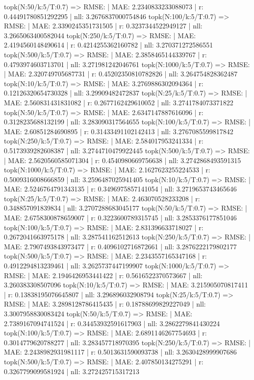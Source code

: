 topk(N:50/k:5/T:0.7) => RMSE: | MAE: 2.2340833233088073 | r: 0.44491780851292295 | nll: 3.2676837000754846
topk(N:100/k:5/T:0.7) => RMSE: | MAE: 2.3390245351731505 | r: 0.3237344522949127 | nll: 3.2665063400582044
topk(N:250/k:5/T:0.7) => RMSE: | MAE: 2.4194560148490614 | r: 0.4214255362160782 | nll: 3.270371272586551
topk(N:500/k:5/T:0.7) => RMSE: | MAE: 2.3858465144339767 | r: 0.4793974603713701 | nll: 3.271981242046761
topk(N:1000/k:5/T:0.7) => RMSE: | MAE: 2.320749705687731 | r: 0.45202350810782826 | nll: 3.264754828362487
topk(N:10/k:5/T:0.7) => RMSE: | MAE: 3.2769886302094364 | r: 0.12126320654730328 | nll: 3.29909482472837
topk(N:25/k:5/T:0.7) => RMSE: | MAE: 2.560831431831082 | r: 0.2677162429610052 | nll: 3.2741784073371822
topk(N:50/k:5/T:0.7) => RMSE: | MAE: 2.6347147887616096 | r: 0.3128235688132199 | nll: 3.283090317564655
topk(N:100/k:5/T:0.7) => RMSE: | MAE: 2.60851284690895 | r: 0.31433491102142413 | nll: 3.2767085599817842
topk(N:250/k:5/T:0.7) => RMSE: | MAE: 2.584017953241334 | r: 0.5173939282608387 | nll: 3.2744710479922445
topk(N:500/k:5/T:0.7) => RMSE: | MAE: 2.5620560585071304 | r: 0.4540980669756638 | nll: 3.2742868493591315
topk(N:1000/k:5/T:0.7) => RMSE: | MAE: 2.1627623255224533 | r: 0.5009316008666859 | nll: 3.2596487025941405
topk(N:10/k:5/T:0.7) => RMSE: | MAE: 2.5246764791343135 | r: 0.3496975857141054 | nll: 3.2719653743465646
topk(N:25/k:5/T:0.7) => RMSE: | MAE: 2.463070528233208 | r: 0.348857091839834 | nll: 3.2707288683045177
topk(N:50/k:5/T:0.7) => RMSE: | MAE: 2.6758300878659007 | r: 0.3223600789315745 | nll: 3.2853376177851046
topk(N:100/k:5/T:0.7) => RMSE: | MAE: 2.831396633718027 | r: 0.2672041663975178 | nll: 3.287541162512613
topk(N:250/k:5/T:0.7) => RMSE: | MAE: 2.7907493843973477 | r: 0.4096102716872661 | nll: 3.2876222179802177
topk(N:500/k:5/T:0.7) => RMSE: | MAE: 2.2343557165347168 | r: 0.4912294813239461 | nll: 3.2625737447199907
topk(N:1000/k:5/T:0.7) => RMSE: | MAE: 2.1946426953441422 | r: 0.5616522370573667 | nll: 3.260383308507096
topk(N:10/k:5/T:0.7) => RMSE: | MAE: 3.215905070817411 | r: 0.13838195076645807 | nll: 3.296896032908794
topk(N:25/k:5/T:0.7) => RMSE: | MAE: 3.2898128786415435 | r: 0.18788699829227049 | nll: 3.3007958830083424
topk(N:50/k:5/T:0.7) => RMSE: | MAE: 2.7389167094741524 | r: 0.34453932591617903 | nll: 3.2862279841430224
topk(N:100/k:5/T:0.7) => RMSE: | MAE: 2.6891146267754693 | r: 0.3014779620788277 | nll: 3.283457718970395
topk(N:250/k:5/T:0.7) => RMSE: | MAE: 2.2438982931981117 | r: 0.5013631590093738 | nll: 3.2630428999907686
topk(N:500/k:5/T:0.7) => RMSE: | MAE: 2.407850134275291 | r: 0.3267799099581924 | nll: 3.272425715317213
